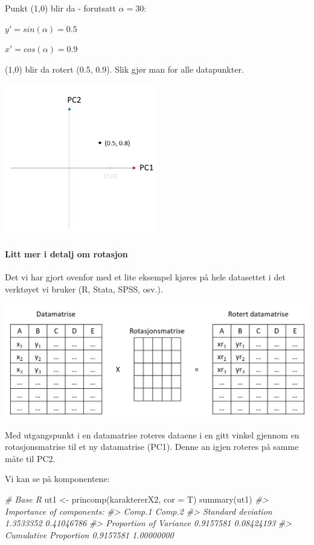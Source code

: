 \documentclass[
]{article}
\newenvironment{Shaded}{\begin{snugshade}}{\end{snugshade}}
\newcommand{\AttributeTok}[1]{\textcolor[rgb]{0.77,0.63,0.00}{#1}}
\newcommand{\CommentTok}[1]{\textcolor[rgb]{0.56,0.35,0.01}{\textit{#1}}}
\newcommand{\FunctionTok}[1]{\textcolor[rgb]{0.00,0.00,0.00}{#1}}
\newcommand{\NormalTok}[1]{#1}
\newcommand{\OtherTok}[1]{\textcolor[rgb]{0.56,0.35,0.01}{#1}}
\begin{document}
Punkt (1,0) blir da - forutsatt \(\alpha=30\):

\(y'= sin(\alpha) = 0.5\)

\(x'= cos(\alpha) = 0.9\)

(1,0) blir da rotert (0.5, 0.9). Slik gjør man for alle datapunkter.

\includegraphics[width=0.5\textwidth,height=\textheight]{rotasjon3.png}

\hypertarget{litt-mer-i-detalj-om-rotasjon}{%
\paragraph{Litt mer i detalj om rotasjon}\label{litt-mer-i-detalj-om-rotasjon}}

Det vi har gjort ovenfor med et lite eksempel kjøres på hele datasettet i det verktøyet vi bruker (R, Stata, SPSS, osv.).

\includegraphics{rotasjonsmatrise.png}

Med utgangspunkt i en datamatrise roteres dataene i en gitt vinkel gjennom en rotasjonsmatrise til et ny datamatrise (PC1). Denne an igjen roteres på samme måte til PC2.

Vi kan se på komponentene:

\begin{Shaded}
\begin{Highlighting}[]
\CommentTok{\# Base R}
\NormalTok{ut1 }\OtherTok{\textless{}{-}} \FunctionTok{princomp}\NormalTok{(karaktererX2, }\AttributeTok{cor =}\NormalTok{ T)}
\FunctionTok{summary}\NormalTok{(ut1)}
\CommentTok{\#\textgreater{} Importance of components:}
\CommentTok{\#\textgreater{}                           Comp.1     Comp.2}
\CommentTok{\#\textgreater{} Standard deviation     1.3533352 0.41046786}
\CommentTok{\#\textgreater{} Proportion of Variance 0.9157581 0.08424193}
\CommentTok{\#\textgreater{} Cumulative Proportion  0.9157581 1.00000000}
\end{Highlighting}
\end{Shaded}
\end{document}
